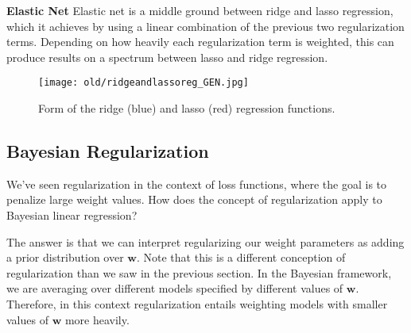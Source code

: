 \textbf{Elastic Net} \newline
Elastic net is a middle ground between ridge and lasso regression, which it achieves by using a linear combination of the previous two regularization terms. Depending on how heavily each regularization term is weighted, this can produce results on a spectrum between lasso and ridge regression. \\

\begin{figure}
    \centering
    \texttt{[image: old/ridgeandlassoreg\_GEN.jpg]}
    \caption{Form of the ridge (blue) and lasso (red) regression functions.}
    \label{fig:ridge-and-lasso-reg-fn-form}
\end{figure}


\subsection{Bayesian Regularization} \label{bayesian-regularization-section}
We've seen regularization in the context of loss functions, where the goal is to penalize large weight values. How does the concept of regularization apply to Bayesian linear regression?

The answer is that we can interpret regularizing our weight parameters as adding a prior distribution over $\bm{w}$. Note that this is a different conception of regularization than we saw in the previous section. In the Bayesian framework, we are averaging over different models specified by different values of $\bm{w}$. Therefore, in this context regularization entails weighting models with smaller values of $\bm{w}$ more heavily.

